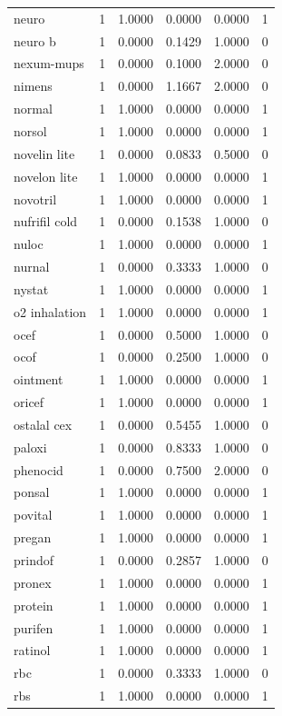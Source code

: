 \begin{longtable}{p{3.0cm}rrrrr}
neuro & 1 & 1.0000 & 0.0000 & 0.0000 & 1 \\
neuro b & 1 & 0.0000 & 0.1429 & 1.0000 & 0 \\
nexum-mups & 1 & 0.0000 & 0.1000 & 2.0000 & 0 \\
nimens & 1 & 0.0000 & 1.1667 & 2.0000 & 0 \\
normal & 1 & 1.0000 & 0.0000 & 0.0000 & 1 \\
norsol & 1 & 1.0000 & 0.0000 & 0.0000 & 1 \\
novelin lite & 1 & 0.0000 & 0.0833 & 0.5000 & 0 \\
novelon lite & 1 & 1.0000 & 0.0000 & 0.0000 & 1 \\
novotril & 1 & 1.0000 & 0.0000 & 0.0000 & 1 \\
nufrifil cold & 1 & 0.0000 & 0.1538 & 1.0000 & 0 \\
nuloc & 1 & 1.0000 & 0.0000 & 0.0000 & 1 \\
nurnal & 1 & 0.0000 & 0.3333 & 1.0000 & 0 \\
nystat & 1 & 1.0000 & 0.0000 & 0.0000 & 1 \\
o2 inhalation & 1 & 1.0000 & 0.0000 & 0.0000 & 1 \\
ocef & 1 & 0.0000 & 0.5000 & 1.0000 & 0 \\
ocof & 1 & 0.0000 & 0.2500 & 1.0000 & 0 \\
ointment & 1 & 1.0000 & 0.0000 & 0.0000 & 1 \\
oricef & 1 & 1.0000 & 0.0000 & 0.0000 & 1 \\
ostalal cex & 1 & 0.0000 & 0.5455 & 1.0000 & 0 \\
paloxi & 1 & 0.0000 & 0.8333 & 1.0000 & 0 \\
phenocid & 1 & 0.0000 & 0.7500 & 2.0000 & 0 \\
ponsal & 1 & 1.0000 & 0.0000 & 0.0000 & 1 \\
povital & 1 & 1.0000 & 0.0000 & 0.0000 & 1 \\
pregan & 1 & 1.0000 & 0.0000 & 0.0000 & 1 \\
prindof & 1 & 0.0000 & 0.2857 & 1.0000 & 0 \\
pronex & 1 & 1.0000 & 0.0000 & 0.0000 & 1 \\
protein & 1 & 1.0000 & 0.0000 & 0.0000 & 1 \\
purifen & 1 & 1.0000 & 0.0000 & 0.0000 & 1 \\
ratinol & 1 & 1.0000 & 0.0000 & 0.0000 & 1 \\
rbc & 1 & 0.0000 & 0.3333 & 1.0000 & 0 \\
rbs & 1 & 1.0000 & 0.0000 & 0.0000 & 1 \\

\end{longtable}
